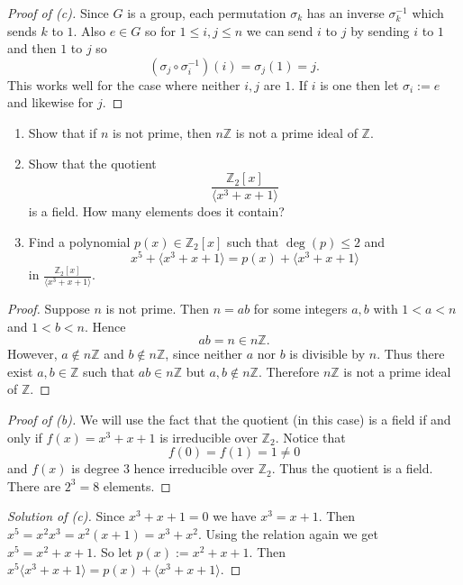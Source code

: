 \begin{proof}[Proof of (c)]
    Since $G$ is a group, each permutation $\sigma_k$ has an 
    inverse $\sigma_k^{-1}$ which sends $k$ to $1$.
    Also $e \in G$ so for $1 \leq i,j \leq n$ we can send 
    $i$ to $j$ by sending $i$ to $1$ and then $1$ to $j$ so 
    \[
        (\sigma_j \circ \sigma_i^{-1})(i) = 
        \sigma_j(1) = j.
    \]
    This works well for the case where neither $i,j$ are 
    $1$. If $i$ is one then let $\sigma_i := e$ and likewise 
    for $j$.
\end{proof}
\begin{prob}[3 Exam 2019]
    \begin{enumerate}[label=\alph*)]
        \item Show that if $n$ is not prime, then $n \mathbb Z$ 
            is not a prime ideal of $\mathbb Z$.
        \item Show that the quotient 
            \[
                \frac{\mathbb Z_2[x]}{\langle x^3 + x + 1\rangle}
            \]
            is a field.
            How many elements does it contain?
        \item Find a polynomial $p(x) \in \mathbb Z_2[x]$ such that 
            $\deg(p) \leq 2$ and 
            \[
                x^5 + \langle x^3 + x + 1 \rangle
                = 
                p(x) + \langle x^3 + x + 1\rangle
            \]
            in $\frac{\mathbb Z_2[x]}{\langle x^3 + x + 1 \rangle}$.
    \end{enumerate}
\end{prob}
\begin{proof}
    Suppose $n$ is not prime. Then $n=ab$ for some integers
    $a,b$ with $1<a<n$ and $1<b<n$. Hence
    \[
        ab=n\in n\mathbb Z.
    \]
    However, $a\notin n\mathbb Z$ and $b\notin n\mathbb Z$, since
    neither
    $a$ nor $b$ is divisible by $n$. Thus there exist 
    $a,b\in\mathbb Z$
    such that $ab\in n\mathbb Z$ but $a,b\notin n\mathbb Z$.
    Therefore $n\mathbb Z$ is not a prime ideal of $\mathbb Z$.
\end{proof}
\begin{proof}[Proof of (b)]
    We will use the fact that the quotient (in this case) is a field 
    if and only if $f(x) = x^3 + x + 1$ is irreducible over 
    $\mathbb Z_2$. Notice that 
    \[
        f(0) = f(1) = 1 \neq 0
    \]
    and $f(x)$ is degree $3$ hence irreducible over 
    $\mathbb Z_2$. Thus the quotient is a field.
    There are $2^3 = 8$ elements.
\end{proof}
\begin{proof}[Solution of (c)]
    Since $x^3 + x + 1 = 0$ we have $x^3 = x + 1$. 
    Then $x^5 = x^2x^3 = x^2(x+1) = x^3 + x^2$. 
    Using the relation again we get 
    $x^5 = x^2 + x + 1$. So let $p(x) := x^2 + x + 1$. Then 
    $x^5 \langle x^3 + x + 1\rangle = p(x) + \langle x^3 + x 
    + 1\rangle$.
\end{proof}

